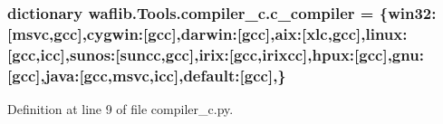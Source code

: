 \subsubsection[{\texorpdfstring{c\+\_\+compiler}{c_compiler}}]{\setlength{\rightskip}{0pt plus 5cm}dictionary waflib.\+Tools.\+compiler\+\_\+c.\+c\+\_\+compiler = \{\textquotesingle{}win32\textquotesingle{}\+:\mbox{[}\textquotesingle{}msvc\textquotesingle{},\textquotesingle{}gcc\textquotesingle{}\mbox{]},\textquotesingle{}cygwin\textquotesingle{}\+:\mbox{[}\textquotesingle{}gcc\textquotesingle{}\mbox{]},\textquotesingle{}darwin\textquotesingle{}\+:\mbox{[}\textquotesingle{}gcc\textquotesingle{}\mbox{]},\textquotesingle{}aix\textquotesingle{}\+:\mbox{[}\textquotesingle{}xlc\textquotesingle{},\textquotesingle{}gcc\textquotesingle{}\mbox{]},\textquotesingle{}linux\textquotesingle{}\+:\mbox{[}\textquotesingle{}gcc\textquotesingle{},\textquotesingle{}icc\textquotesingle{}\mbox{]},\textquotesingle{}sunos\textquotesingle{}\+:\mbox{[}\textquotesingle{}suncc\textquotesingle{},\textquotesingle{}gcc\textquotesingle{}\mbox{]},\textquotesingle{}irix\textquotesingle{}\+:\mbox{[}\textquotesingle{}gcc\textquotesingle{},\textquotesingle{}irixcc\textquotesingle{}\mbox{]},\textquotesingle{}hpux\textquotesingle{}\+:\mbox{[}\textquotesingle{}gcc\textquotesingle{}\mbox{]},\textquotesingle{}gnu\textquotesingle{}\+:\mbox{[}\textquotesingle{}gcc\textquotesingle{}\mbox{]},\textquotesingle{}java\textquotesingle{}\+:\mbox{[}\textquotesingle{}gcc\textquotesingle{},\textquotesingle{}msvc\textquotesingle{},\textquotesingle{}icc\textquotesingle{}\mbox{]},\textquotesingle{}default\textquotesingle{}\+:\mbox{[}\textquotesingle{}gcc\textquotesingle{}\mbox{]},\}}\hypertarget{namespacewaflib_1_1_tools_1_1compiler__c_af025fb02fdf9ddca8d52b092ba56d51b}{}\label{namespacewaflib_1_1_tools_1_1compiler__c_af025fb02fdf9ddca8d52b092ba56d51b}


Definition at line 9 of file compiler\+\_\+c.\+py.

